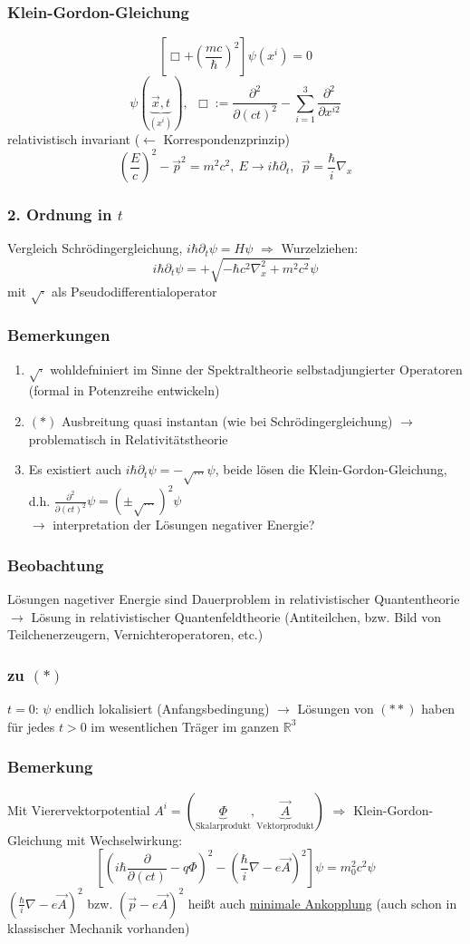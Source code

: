 \documentclass[twoside,a4paper]{scrartcl}
\newcommand{\R}{\mathbb{R}}
\renewcommand{\1}{\mathds{1}}
\newcommand{\Ra}{\Rightarrow}
\newcommand{\ra}{\rightarrow}
\newcommand{\la}{\leftarrow}
\renewcommand{\R}{\mathbb{R}}
\begin{document}
\subsubsection*{Klein-Gordon-Gleichung}
$$[\Box+(\frac{mc}{\hbar})^2] \psi(x^i)=0$$
$$\psi(\underbrace{\vec x,t}_{(x^i)}), \ \ \Box:=\frac{\partial^2}{\partial (ct)^2}-\sum_{i=1}^3 \frac{\partial^2}{\partial x^{i2}}$$
relativistisch invariant ($\la$ Korrespondenzprinzip)
$$(\frac{E}{c})^2-\vec p^2=m^2c^2, \ E \ra i\hbar \partial_t, \ \ \vec p=\frac{\hbar}{i}\nabla_x$$
\subsubsection*{2. Ordnung in $t$}
Vergleich Schrödingergleichung, $i\hbar \partial_t \psi=H\psi$ $\Ra$ Wurzelziehen:
$$i\hbar \partial_t \psi=+\sqrt{-\hbar c^2 \nabla_x^2+m^2c^2}\psi$$
mit $\sqrt{\cdot}$ als Pseudodifferentialoperator
\subsubsection*{Bemerkungen}
\begin{enumerate}
\item $\sqrt{\cdot}$ wohldefniniert im Sinne der Spektraltheorie selbstadjungierter Operatoren (formal in Potenzreihe entwickeln)
\item $(*)$ Ausbreitung quasi instantan (wie bei Schrödingergleichung) $\ra$ problematisch in Relativitätstheorie
\item Es existiert auch $i\hbar \partial_t \psi=-\sqrt{...}\psi$, beide lösen die Klein-Gordon-Gleichung, d.h. $\frac{\partial^2}{\partial (ct)^2}\psi=(\pm \sqrt{...})^2 \psi$\\
$\ra$ interpretation der Lösungen negativer Energie?
\end{enumerate}
\subsubsection*{Beobachtung}
Lösungen nagetiver Energie sind Dauerproblem in relativistischer Quantentheorie $\ra$ Lösung in relativistischer Quantenfeldtheorie (Antiteilchen, bzw. Bild von Teilchenerzeugern, Vernichteroperatoren, etc.)
\subsubsection*{zu $(*)$}
$t=0$: $\psi$ endlich lokalisiert (Anfangsbedingung) $\ra$ Lösungen von $(**)$ haben für jedes $t>0$ im wesentlichen Träger im ganzen $\R^3$
\subsubsection*{Bemerkung}
Mit Vierervektorpotential $A^i=(\underbrace{\Phi}_{\mathrm{Skalarprodukt}},\underbrace{\vec A}_{\mathrm{Vektorprodukt}})$ $\Ra$ Klein-Gordon-Gleichung mit Wechselwirkung:
$$[(i\hbar \frac{\partial}{\partial (ct)}-q \Phi)^2-(\frac{\hbar}{i}\nabla -e \vec A)^2]\psi=m_0^2c^2\psi$$
$(\frac{\hbar}{i}\nabla -e \vec A)^2$ bzw. $(\vec p-e \vec A)^2$ heißt auch \underline{minimale Ankopplung} (auch schon in klassischer Mechanik vorhanden)
\end{document}
